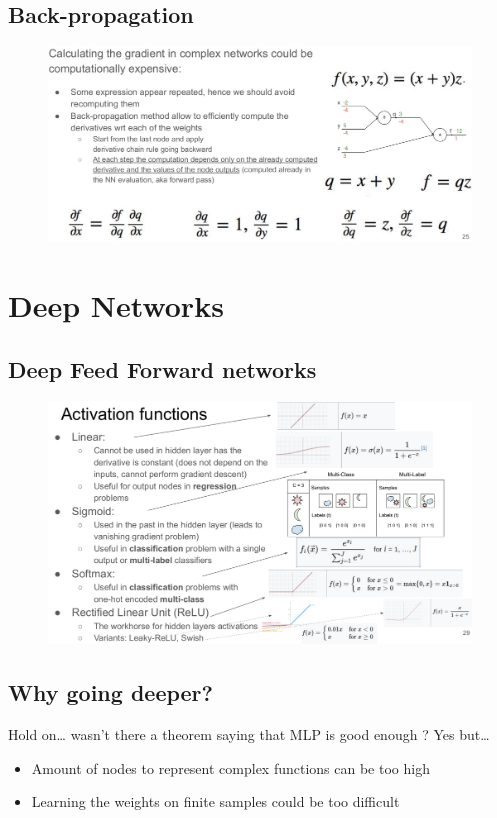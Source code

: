 \subsection{Back-propagation}

\begin{figure}[ht]
	\centering
	\includegraphics[width=1\linewidth]{figure_ml/backpropagation.png}
\end{figure}
\FloatBarrier


\section{Deep Networks}

\subsection{Deep Feed Forward networks}

\begin{figure}[ht]
	\centering
	\includegraphics[width=1\linewidth]{figure_ml/activation_functions.png}
\end{figure}
\FloatBarrier


\subsection{Why going deeper?}
Hold on… wasn’t there a theorem saying that MLP is good enough ? Yes but…
\begin{itemize}
	\item Amount of nodes to represent complex functions can be too high
	\item Learning the weights on finite samples could be too difficult
\end{itemize}

